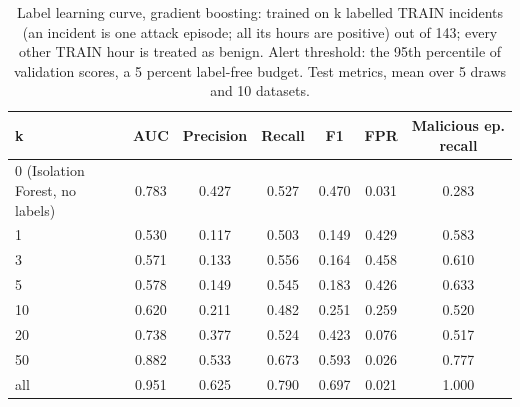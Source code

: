 \begin{table}[t]
\centering
\scriptsize
\caption{Label learning curve, gradient boosting: trained on k labelled TRAIN incidents (an incident is one attack episode; all its hours are positive) out of 143; every other TRAIN hour is treated as benign. Alert threshold: the 95th percentile of validation scores, a 5 percent label-free budget. Test metrics, mean over 5 draws and 10 datasets.}
\label{tab:lc-boosting-b5}
\begin{tabular}{lcccccc}
\hline
k & AUC & Precision & Recall & F1 & FPR & Malicious ep. recall \\
\hline
0 (Isolation Forest, no labels) & 0.783 & 0.427 & 0.527 & 0.470 & 0.031 & 0.283 \\
1 & 0.530 & 0.117 & 0.503 & 0.149 & 0.429 & 0.583 \\
3 & 0.571 & 0.133 & 0.556 & 0.164 & 0.458 & 0.610 \\
5 & 0.578 & 0.149 & 0.545 & 0.183 & 0.426 & 0.633 \\
10 & 0.620 & 0.211 & 0.482 & 0.251 & 0.259 & 0.520 \\
20 & 0.738 & 0.377 & 0.524 & 0.423 & 0.076 & 0.517 \\
50 & 0.882 & 0.533 & 0.673 & 0.593 & 0.026 & 0.777 \\
all & 0.951 & 0.625 & 0.790 & 0.697 & 0.021 & 1.000 \\
\hline
\end{tabular}
\end{table}
